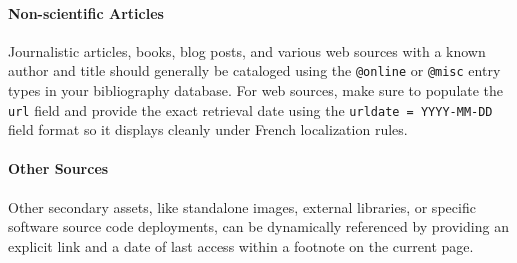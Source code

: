 \paragraph{Non-scientific Articles} Journalistic articles, books, blog posts, and various web sources with a known author and title should generally be cataloged using the \texttt{@online} or \texttt{@misc} entry types in your bibliography database. For web sources, make sure to populate the \texttt{url} field and provide the exact retrieval date using the \texttt{urldate = {YYYY-MM-DD}} field format so it displays cleanly under French localization rules.

\paragraph{Other Sources} Other secondary assets, like standalone images, external libraries, or specific software source code deployments, can be dynamically referenced by providing an explicit link and a date of last access within a footnote on the current page.